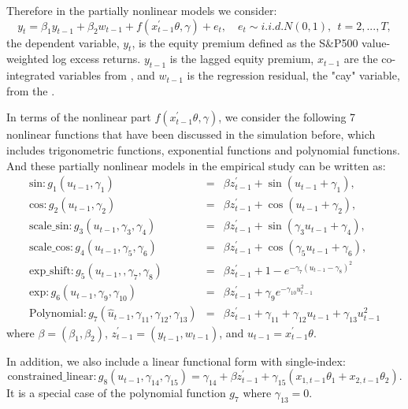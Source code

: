 \documentclass[a4paper,12pt,times,numbered,print,index]{report}
\numberwithin{equation}{section}
\begin{document}
Therefore in the partially nonlinear models we consider: 
$$
y_{t} = \beta_{1} y_{t-1} + \beta_{2} w_{t-1} + f\left( x_{t-1}^{\prime }\theta,\gamma\right) +e_{t}, \quad
e_{t}\sim i.i.d.N\left( 0,1\right) ,\ \ t=2,...,T,
$$
the dependent variable, $y_t$, is the equity premium defined as the S\&P500 value-weighted log excess returns. $y_{t-1}$ is the lagged equity premium, $x_{t-1}$ are the co-integrated variables from \cite{zhou2018semiparametric}, and $w_{t-1}$ is the regression residual, the "cay" variable, from the \cite{lettau2001consumption}. 

In terms of the nonlinear part $f\left( x_{t-1}^{\prime }\theta,\gamma\right)$, we consider the following 7 nonlinear functions that have been discussed in the simulation before, which includes trigonometric functions, exponential functions and polynomial functions. And these partially nonlinear models in the empirical study can be written as:
\begin{eqnarray*}
	\text{sin}: g_{1}\left( {u}_{t-1},\gamma _{1}\right) &=& \beta z_{t-1}^{\prime} + \sin \left( {u}_{t-1}+\gamma_{1}\right),  \\
	\text{cos}: g_{2}\left( {u}_{t-1},\gamma _{2}\right) &=& \beta z_{t-1}^{\prime} + \cos \left( {u}_{t-1}+\gamma_{2}\right), \\
	\text{scale\_sin}: g_{3}\left( {u}_{t-1},\gamma_{3}, \gamma_{4}\right) &=& \beta z_{t-1}^{\prime} + \sin \left( \gamma_{3}{u}_{t-1}+\gamma_{4}\right),  \\
	\text{scale\_cos}: g_{4}\left( {u}_{t-1},\gamma_{5}, \gamma_{6}\right) &=& \beta z_{t-1}^{\prime} + \cos \left( \gamma_{5}{u}_{t-1}+\gamma_{6}\right), \\
	\text{exp\_shift}: g_{5}\left( {u}_{t-1},,\gamma_{7}, \gamma_{8}\right) &=&  \beta z_{t-1}^{\prime} + 1-e^{-\gamma_{7}\left({u}_{t-1}-\gamma_{8}\right)^{2}} \\
	\text{exp}: g_{6}\left( {u}_{t-1},\gamma_{9}, \gamma_{10}\right) &=&  \beta z_{t-1}^{\prime} + \gamma_{9} e^{-\gamma_{10}{u}_{t-1}^2}  \\
	\text{Polynomial}: g_{7}\left( \hat{u}_{t-1},\gamma_{11}, \gamma_{12}, \gamma_{13}\right) &=& \beta z_{t-1}^{\prime} + \gamma_{11}+ \gamma_{12}{u}_{t-1}+\gamma_{13}{u}_{t-1}^{2}
\end{eqnarray*}%
where $\beta = (\beta_{1}, \beta_{2})$, $ z_{t-1}^{\prime } = (y_{t-1}, w_{t-1})$, and $u_{t-1} =  x_{t-1}^{\prime }\theta$.


In addition, we also include a linear functional form with single-index:
$$
\text{constrained\_linear}: g_8\left( u_{t-1},\gamma_{14}, \gamma_{15}\right) = \gamma_{14} +\beta z_{t-1}^{\prime} + \gamma_{15}(x_{1,t-1}\theta _{1} + x_{2,t-1}\theta _{2}).
$$
It is a special case of the polynomial function $g_7$ where  $\gamma_{13} = 0$.
\end{document}
